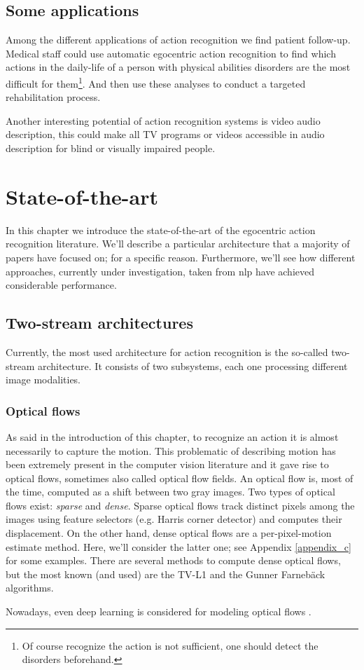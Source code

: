 \documentclass[12pt, a4paper]{report}
\begin{document}
				\subsection*{Some applications}
					Among the different applications of action recognition we find patient follow-up.
					Medical staff could use automatic egocentric action recognition to find which actions in the daily-life of a person with physical abilities disorders are the most difficult for them\footnote{Of course recognize the action is not sufficient, one should detect the disorders beforehand.}.
					And then use these analyses to conduct a targeted rehabilitation process.
					\par
					Another interesting potential of action recognition systems is video audio description, this could make all TV programs or videos accessible in audio description for blind or visually impaired people.
		\section{State-of-the-art}
			In this chapter we introduce the state-of-the-art of the egocentric action recognition literature.
			We'll describe a particular architecture that a majority of papers have focused on; for a specific reason.
			Furthermore, we'll see how different approaches, currently under investigation, taken from \gls{nlp} have achieved considerable performance.
			\subsection{Two-stream architectures}\label{twostream}
				Currently, the most used architecture for action recognition is the so-called two-stream architecture.
				It consists of two subsystems, each one processing different image modalities.
				\subsubsection{Optical flows}
					As said in the introduction of this chapter, to recognize an action it is almost necessarily to capture the motion.
					This problematic of describing motion has been extremely present in the computer vision literature and it gave rise to optical flows, sometimes also called optical flow fields.
					An optical flow is, most of the time, computed as a shift between two gray images.
					Two types of optical flows exist: {\itshape sparse} and {\itshape dense}.
					Sparse optical flows track distinct pixels among the images using feature selectors (e.g. Harris corner detector) and computes their displacement.
					On the other hand, dense optical flows are a per-pixel-motion estimate method.
					Here, we'll consider the latter one; see Appendix \ref{appendix_c} for some examples.
					There are several methods to compute dense optical flows, but the most known (and used) are the TV-L1 \cite{perez2013tv} and the Gunner Farnebäck \cite{farneback2003two} algorithms.
					\par
					Nowadays, even deep learning is considered for modeling optical flows \cite{hur2020optical}.
\end{document}
